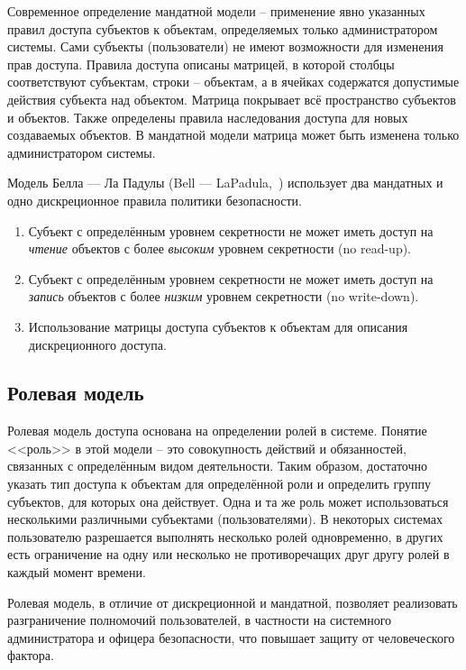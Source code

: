 Современное определение мандатной модели -- применение явно указанных правил доступа субъектов к объектам, определяемых только администратором системы. Сами субъекты (пользователи) не имеют возможности для изменения прав доступа. Правила доступа описаны матрицей, в которой столбцы соответствуют субъектам, строки -- объектам, а в ячейках содержатся допустимые действия субъекта над объектом. Матрица покрывает всё пространство субъектов и объектов. Также определены правила наследования доступа для новых создаваемых объектов. В мандатной модели матрица может быть изменена только администратором системы.

Модель Белла --- Ла Падулы (Bell --- LaPadula,~\cite{Bell:LaPadula:1973, Bell:LaPadula:1976}) использует два мандатных и одно дискреционное правила политики безопасности.
\begin{enumerate}
    \item Субъект с определённым уровнем секретности не может иметь доступ на \emph{чтение} объектов с более \emph{высоким} уровнем секретности (no read-up).
    \item Субъект с определённым уровнем секретности не может иметь доступ на \emph{запись} объектов с более \emph{низким} уровнем секретности (no write-down).
    \item Использование матрицы доступа субъектов к объектам для описания дискреционного доступа.
\end{enumerate}

\subsection{Ролевая модель}

Ролевая модель доступа основана на определении ролей в системе. Понятие <<роль>> в этой модели -- это совокупность действий и обязанностей, связанных с определённым видом деятельности. Таким образом, достаточно указать тип доступа к объектам для определённой роли и определить группу субъектов, для которых она действует.
Одна и та же роль может использоваться несколькими различными субъектами (пользователями). В некоторых системах пользователю разрешается выполнять несколько ролей одновременно, в других есть ограничение на одну или несколько не противоречащих друг другу ролей в каждый момент времени.

Ролевая модель, в отличие от дискреционной и мандатной, позволяет реализовать разграничение полномочий пользователей, в частности на системного администратора и офицера безопасности, что повышает защиту от человеческого фактора.
